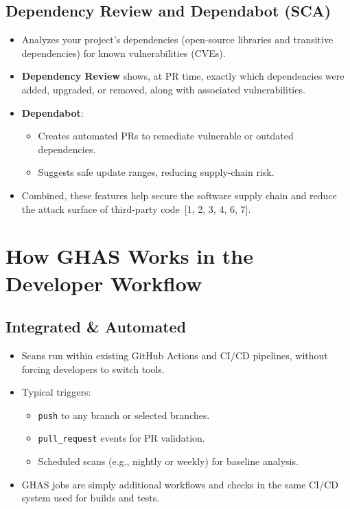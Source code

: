 \documentclass[11pt]{article}
\begin{document}
\subsection{Dependency Review and Dependabot (SCA)}

\begin{itemize}[leftmargin=*]
  \item Analyzes your project's dependencies (open-source libraries and transitive dependencies) for known vulnerabilities (CVEs).
  \item \textbf{Dependency Review} shows, at PR time, exactly which dependencies were added, upgraded, or removed, along with associated vulnerabilities.
  \item \textbf{Dependabot}:
    \begin{itemize}
      \item Creates automated PRs to remediate vulnerable or outdated dependencies.
      \item Suggests safe update ranges, reducing supply-chain risk.
    \end{itemize}
  \item Combined, these features help secure the software supply chain and reduce the attack surface of third-party code~[1, 2, 3, 4, 6, 7].
\end{itemize}

\section{How GHAS Works in the Developer Workflow}

\subsection{Integrated \& Automated}

\begin{itemize}[leftmargin=*]
  \item Scans run within existing GitHub Actions and CI/CD pipelines, without forcing developers to switch tools.
  \item Typical triggers:
    \begin{itemize}
      \item \texttt{push} to any branch or selected branches.
      \item \texttt{pull\_request} events for PR validation.
      \item Scheduled scans (e.g., nightly or weekly) for baseline analysis.
    \end{itemize}
  \item GHAS jobs are simply additional workflows and checks in the same CI/CD system used for builds and tests.
\end{itemize}
\end{document}
